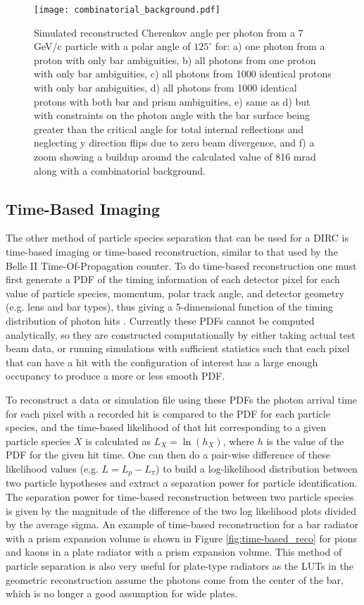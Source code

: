 \begin{figure}[!htb]
	\centering
	\texttt{[image: combinatorial\_background.pdf]}
	\caption{Simulated reconstructed Cherenkov angle per photon from a 7 GeV/c particle with a polar angle of $125^{\circ}$ for: a) one photon from a proton with only bar ambiguities, b) all photons from one proton with only bar ambiguities, c) all photons from 1000 identical protons with only bar ambiguities, d) all photons from 1000 identical protons with both bar and prism ambiguities, e) same as d) but with constraints on the photon angle with the bar surface being greater than the critical angle for total internal reflections and neglecting y direction flips due to zero beam divergence, and f) a zoom showing a buildup around the calculated value of 816 mrad along with a combinatorial background.}
	\label{fig:combinatorial_background}
\end{figure}

\subsection{Time-Based Imaging}
The other method of particle species separation that can be used for a DIRC is time-based imaging or time-based reconstruction, similar to that used by the Belle II Time-Of-Propagation counter. To do time-based reconstruction one must first generate a PDF of the timing information of each detector pixel for each value of particle species, momentum, polar track angle, and detector geometry (e.g. lens and bar types), thus giving a 5-dimensional function  of the timing distribution of photon hits \cite{PANDA_barrel}. Currently these PDFs cannot be computed analytically, so they are constructed computationally by either taking actual test beam data, or running simulations with sufficient statistics such that each pixel that can have a hit with the configuration of interest has a large enough occupancy to produce a more or less smooth PDF.

To reconstruct a data or simulation file using these PDFs the photon arrival time for each pixel with a recorded hit is compared to the PDF for each particle species, and the time-based likelihood of that hit corresponding to a given particle species $X$ is calculated as $L_{X} = \ln(h_{X})$, where $h$ is the value of the PDF for the given hit time. One can then do a pair-wise difference of these likelihood values (e.g. $L = L_{p} - L_{\pi}$) to build a log-likelihood distribution between two particle hypotheses and extract a separation power for particle identification. The separation power for time-based reconstruction between two particle species is given by the magnitude of the difference of the two log likelihood plots divided by the average sigma. An example of time-based reconstruction for a bar radiator with a prism expansion volume is shown in Figure \ref{fig:time-based_reco} for pions and kaons in a plate radiator with a prism expansion volume. This method of particle separation is also very useful for plate-type radiators as the LUTs in the geometric reconstruction assume the photons come from the center of the bar, which is no longer a good assumption for wide plates. 

